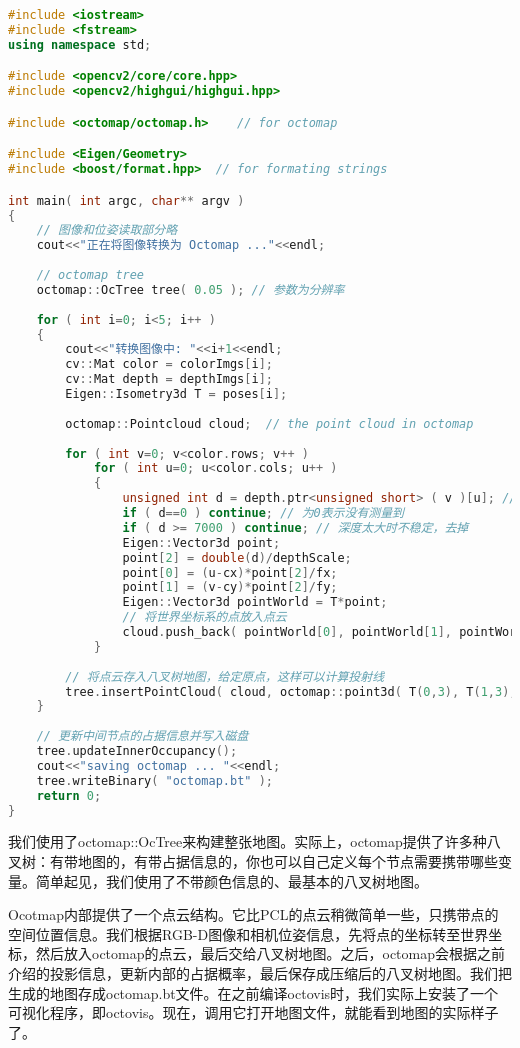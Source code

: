 \begin{lstlisting}[language=c++,caption=slambook/ch13/dense\_RGBD/octomap\_mapping.cpp（片段）]
#include <iostream>
#include <fstream>
using namespace std;

#include <opencv2/core/core.hpp>
#include <opencv2/highgui/highgui.hpp>

#include <octomap/octomap.h>    // for octomap 

#include <Eigen/Geometry> 
#include <boost/format.hpp>  // for formating strings

int main( int argc, char** argv )
{
	// 图像和位姿读取部分略
	cout<<"正在将图像转换为 Octomap ..."<<endl;
	
	// octomap tree 
	octomap::OcTree tree( 0.05 ); // 参数为分辨率
	
	for ( int i=0; i<5; i++ )
	{
		cout<<"转换图像中: "<<i+1<<endl; 
		cv::Mat color = colorImgs[i]; 
		cv::Mat depth = depthImgs[i];
		Eigen::Isometry3d T = poses[i];
		
		octomap::Pointcloud cloud;  // the point cloud in octomap 
		
		for ( int v=0; v<color.rows; v++ )
			for ( int u=0; u<color.cols; u++ )
			{
				unsigned int d = depth.ptr<unsigned short> ( v )[u]; // 深度值
				if ( d==0 ) continue; // 为0表示没有测量到
				if ( d >= 7000 ) continue; // 深度太大时不稳定，去掉
				Eigen::Vector3d point; 
				point[2] = double(d)/depthScale; 
				point[0] = (u-cx)*point[2]/fx;
				point[1] = (v-cy)*point[2]/fy; 
				Eigen::Vector3d pointWorld = T*point;
				// 将世界坐标系的点放入点云
				cloud.push_back( pointWorld[0], pointWorld[1], pointWorld[2] ); 
			}
	
		// 将点云存入八叉树地图，给定原点，这样可以计算投射线
		tree.insertPointCloud( cloud, octomap::point3d( T(0,3), T(1,3), T(2,3) ) );     
	}
	
	// 更新中间节点的占据信息并写入磁盘
	tree.updateInnerOccupancy();
	cout<<"saving octomap ... "<<endl;
	tree.writeBinary( "octomap.bt" );
	return 0;
}
\end{lstlisting}

我们使用了octomap::OcTree来构建整张地图。实际上，octomap提供了许多种八叉树：有带地图的，有带占据信息的，你也可以自己定义每个节点需要携带哪些变量。简单起见，我们使用了不带颜色信息的、最基本的八叉树地图。

Ocotmap内部提供了一个点云结构。它比PCL的点云稍微简单一些，只携带点的空间位置信息。我们根据RGB-D图像和相机位姿信息，先将点的坐标转至世界坐标，然后放入octomap的点云，最后交给八叉树地图。之后，octomap会根据之前介绍的投影信息，更新内部的占据概率，最后保存成压缩后的八叉树地图。我们把生成的地图存成octomap.bt文件。在之前编译octovis时，我们实际上安装了一个可视化程序，即octovis。现在，调用它打开地图文件，就能看到地图的实际样子了。

